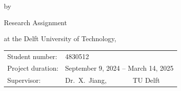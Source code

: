 \begin{titlepage}


\begin{center}


{\makeatletter
\largetitlestyle\fontsize{32}{94}\selectfont\@title
\makeatother}

{\makeatletter
\ifx\@subtitle\undefined\else
    \bigskip
   {\tudsffamily\fontsize{22}{32}\selectfont\@subtitle}    
\fi
\makeatother}

\bigskip
\bigskip

by

\bigskip
\bigskip

{\makeatletter
\largetitlestyle\fontsize{26}{26}\selectfont\@author
\makeatother}

\bigskip
\bigskip

Research Assignment

at the Delft University of Technology,


\vfill

\begin{tabular}{lll}
    Student number: & 4830512 \\
    Project duration: & \multicolumn{2}{l}{September 9, 2024 -- March 14, 2025} \\
    Supervisor: & Dr.\ X.\ Jiang, & TU Delft \\
\end{tabular}

\bigskip
\bigskip


\bigskip
\bigskip




\end{center}


\end{titlepage}


